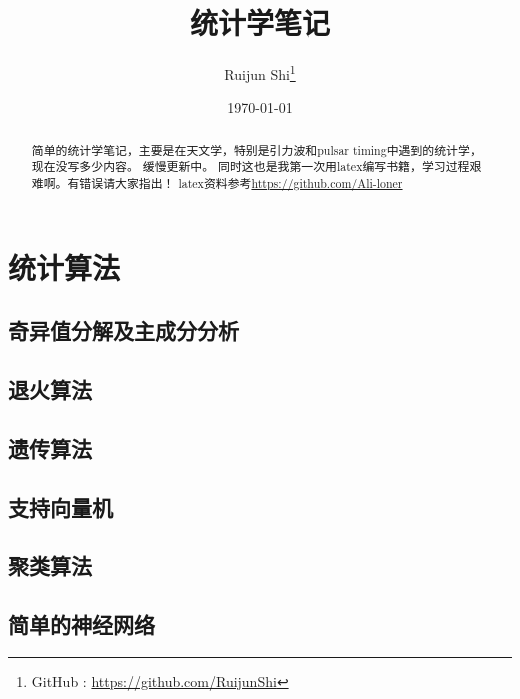 \documentclass[fontset=windows]{report}
\title{\heiti\zihao{1} 统计学笔记}
\author{\songti\zihao{3} Ruijun Shi\thanks{GitHub : \href{https://github.com/RuijunShi}{https://github.com/RuijunShi}}}
\date{\songti\zihao{3} \today}
\begin{document}
	\maketitle
	\thispagestyle{empty}
\begin{abstract}
	简单的统计学笔记，主要是在天文学，特别是引力波和pulsar timing中遇到的统计学，现在没写多少内容。
	缓慢更新中\cite{jaranowski_analysis_2009}。
	同时这也是我第一次用latex编写书籍，学习过程艰难啊。有错误请大家指出！
	latex资料参考\href{https://github.com/Ali-loner/Ali-loner.github.io}{https://github.com/Ali-loner}
\end{abstract}

\tableofcontents %
\newtheorem{definition}{\textbf{\heiti 定义}}[chapter]
\newtheorem{prop}{\textbf{\heiti 性质}}[chapter]
\newtheorem{theorem}{\textbf{\heiti 定理}}[chapter]







\chapter{统计算法}
	\section{奇异值分解及主成分分析}
	\section{退火算法}
	\section{遗传算法}
	\section{支持向量机}
	\section{聚类算法}
	\section{简单的神经网络}

\end{document}
